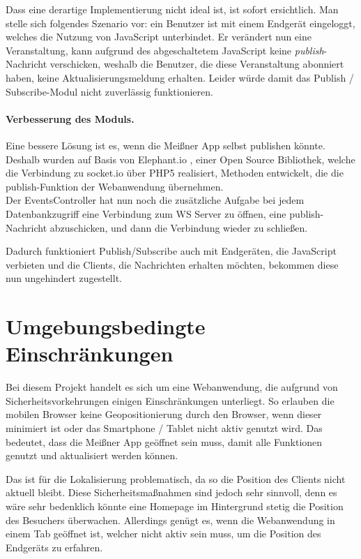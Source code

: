 Dass eine derartige Implementierung nicht ideal ist, ist sofort ersichtlich. Man stelle sich folgendes Szenario vor: ein Benutzer ist mit einem Endgerät eingeloggt, welches die Nutzung von JavaScript unterbindet. Er verändert nun eine Veranstaltung, kann aufgrund des abgeschaltetem JavaScript keine \emph{publish}-Nachricht verschicken, weshalb die Benutzer, die diese Veranstaltung abonniert haben, keine Aktualisierungsmeldung erhalten. Leider würde damit das Publish / Subscribe-Modul nicht zuverlässig funktionieren.

\paragraph{Verbesserung des Moduls.}
Eine bessere Lösung ist es, wenn die Meißner App selbst publishen könnte. Deshalb wurden auf Basis von Elephant.io \cite{elephant.io}, einer Open Source Bibliothek, welche die Verbindung zu socket.io über PHP5 realisiert, Methoden entwickelt, die die publish-Funktion der Webanwendung übernehmen.\\
Der EventsController hat nun noch die zusätzliche Aufgabe bei jedem Datenbankzugriff eine Verbindung zum WS Server zu öffnen, eine publish-Nachricht abzuschicken, und dann die Verbindung wieder zu schließen.\par

Dadurch funktioniert Publish/Subscribe auch mit Endgeräten, die JavaScript verbieten und die Clients, die Nachrichten erhalten möchten, bekommen diese nun ungehindert zugestellt.

\section{Umgebungsbedingte Einschränkungen}
Bei diesem Projekt handelt es sich um eine Webanwendung, die aufgrund von Sicherheitsvorkehrungen einigen Einschränkungen unterliegt. So erlauben die mobilen Browser keine Geopositionierung durch den Browser, wenn dieser minimiert ist oder das Smartphone / Tablet nicht aktiv genutzt wird. Das bedeutet, dass die Meißner App geöffnet sein muss, damit alle Funktionen genutzt und aktualisiert werden können.\par

Das ist für die Lokalisierung problematisch, da so die Position des Clients nicht aktuell bleibt. Diese Sicherheitsmaßnahmen sind jedoch sehr sinnvoll, denn es wäre sehr bedenklich könnte eine Homepage im Hintergrund stetig die Position des Besuchers überwachen. Allerdings genügt es, wenn die Webanwendung in einem Tab geöffnet ist, welcher nicht aktiv sein muss, um die Position des Endgeräts zu erfahren.